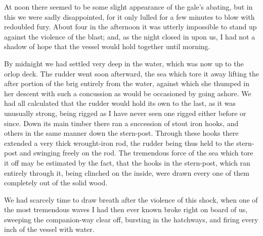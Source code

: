At noon there seemed to be some slight appearance of the gale's abating, but
in this we were sadly disappointed, for it only lulled for a few minutes to blow
with redoubled fury. About four in the afternoon it was utterly impossible to
stand up against the violence of the blast; and, as the night closed in upon us,
I had not a shadow of hope that the vessel would hold together until
morning. 

By midnight we had settled very deep in the water, which was now up to the
orlop deck. The rudder went soon afterward, the sea which tore it away lifting
the after portion of the brig entirely from the water, against which she thumped
in her descent with such a concussion as would be occasioned by going ashore. We
had all calculated that the rudder would hold its own to the last, as it was
unusually strong, being rigged as I have never seen one rigged either before or
since. Down its main timber there ran a succession of stout iron hooks, and
others in the same manner down the stern-post. Through these hooks there
extended a very thick wrought-iron rod, the rudder being thus held to the
stern-post and swinging freely on the rod. The tremendous force of the sea which
tore it off may be estimated by the fact, that the hooks in the stern-post,
which ran entirely through it, being clinched on the inside, were drawn every
one of them completely out of the solid wood. 

We had scarcely time to draw breath after the violence of this shock, when
one of the most tremendous waves I had then ever known broke right on board of
us, sweeping the companion-way clear off, bursting in the hatchways, and firing
every inch of the vessel with water. 


